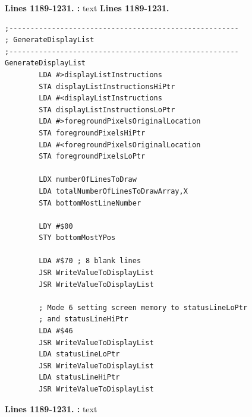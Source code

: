 \textbf{Lines 1189-1231. :} 
text
\clearpage
\textbf{Lines 1189-1231. } 
\begin{lstlisting}
;------------------------------------------------------
; GenerateDisplayList
;------------------------------------------------------
GenerateDisplayList
        LDA #>displayListInstructions
        STA displayListInstructionsHiPtr
        LDA #<displayListInstructions
        STA displayListInstructionsLoPtr
        LDA #>foregroundPixelsOriginalLocation
        STA foregroundPixelsHiPtr
        LDA #<foregroundPixelsOriginalLocation
        STA foregroundPixelsLoPtr

        LDX numberOfLinesToDraw
        LDA totalNumberOfLinesToDrawArray,X
        STA bottomMostLineNumber

        LDY #$00
        STY bottomMostYPos

        LDA #$70 ; 8 blank lines
        JSR WriteValueToDisplayList
        JSR WriteValueToDisplayList

        ; Mode 6 setting screen memory to statusLineLoPtr
        ; and statusLineHiPtr
        LDA #$46
        JSR WriteValueToDisplayList
        LDA statusLineLoPtr
        JSR WriteValueToDisplayList
        LDA statusLineHiPtr
        JSR WriteValueToDisplayList

\end{lstlisting}
\clearpage

\textbf{Lines 1189-1231. :} 
text
\clearpage
\captionsetup[figure]{font=tiny}

